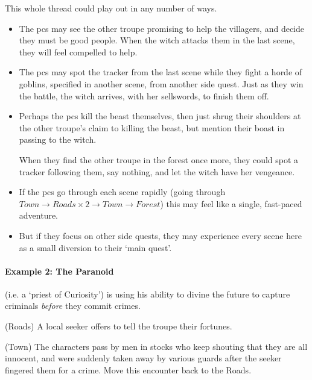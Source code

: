 \begin{multicols}{2}

\noindent
This whole thread could play out in any number of ways.

\begin{itemize}
  \item
  The \glspl{pc} may see the other troupe promising to help the villagers, and decide they must be good people.
  When the witch attacks them in the last scene, they will feel compelled to help.
  \item
  The \glspl{pc} may spot the tracker from the last scene while they fight a horde of goblins, specified in another scene, from another side quest.
  Just as they win the battle, the witch arrives, with her sellswords, to finish them off.
  \item
  Perhaps the \glspl{pc} kill the beast themselves, then just shrug their shoulders at the other troupe's claim to killing the beast, but mention their boast in passing to the witch.

  When they find the other troupe in the forest once more, they could spot a tracker following them, say nothing, and let the witch have her vengeance.
  \item
  If the \glspl{pc} go through each scene rapidly (going through $Town \rightarrow Roads \times 2 \rightarrow Town \rightarrow Forest$) this may feel like a single, fast-paced adventure.
  \item
  But if they focus on other side quests, they may experience every scene here as a small diversion to their `main quest'.
\end{itemize}

\paragraph{Example 2: The Paranoid }

\begin{exampletext}

 (i.e. a `priest of Curiosity') is using his ability to divine the future to capture criminals \emph{before} they commit crimes.

\begin{list}{\sqn}{}

  \item[\sqr\squash]
  (Roads) A local \gls{seeker} offers to tell the troupe their fortunes.

  \item
  (Town) The characters pass by men in stocks who keep shouting that they are all innocent, and were suddenly taken away by various guards after the \gls{seeker} fingered them for a crime.
  Move this encounter back to the Roads.


\end{list}
\end{exampletext}
\end{multicols}
